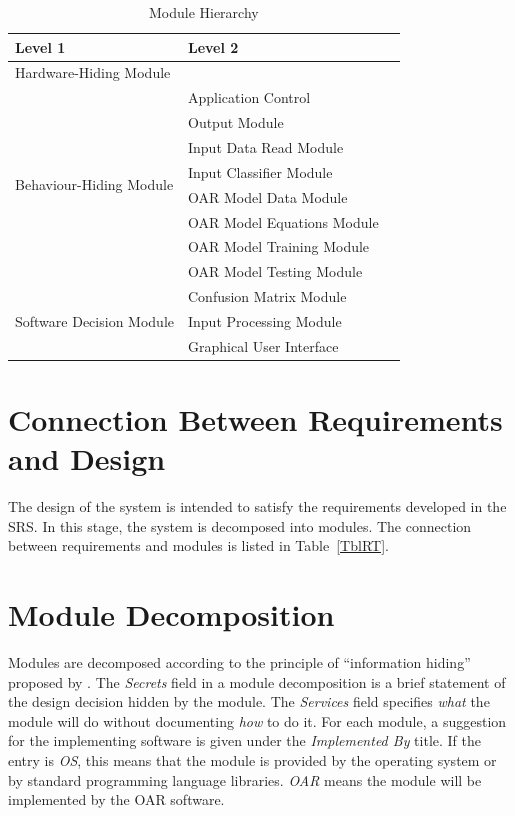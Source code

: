 \documentclass[12pt, titlepage]{article}
\begin{document}
\begin{table}[h!]
\centering
\begin{tabular}{p{} p{} p{}}
\toprule
\textbf{Level 1} & \textbf{Level 2}\\
\midrule
  
{Hardware-Hiding Module}\\
\midrule
  
\multirow{8}{0.3\textwidth}{Behaviour-Hiding Module}
  & Application Control \\
    \cline{2-3}
  & Output Module\\
  & Input Data Read Module \\
  & Input Classifier Module\\
    \cline{2-3}
  & OAR Model Data Module \\
  & OAR Model Equations Module \\
  & OAR Model Training Module \\
  & OAR Model Testing Module \\
  \midrule
  
  \multirow{3}{0.3\textwidth}{Software Decision Module}
    & Confusion Matrix Module \\
    \cline{2-3}
    & Input Processing Module \\
    \cline{2-3}
    & Graphical User Interface \\
  \bottomrule
  
  \end{tabular}
\caption{Module Hierarchy}
\label{TblMH}
\end{table}

\section{Connection Between Requirements and Design} \label{SecConnection}

The design of the system is intended to satisfy the requirements developed in
the SRS. In this stage, the system is decomposed into modules. The connection
between requirements and modules is listed in Table~\ref{TblRT}.

\section{Module Decomposition} \label{SecMD}

Modules are decomposed according to the principle of ``information hiding''
proposed by \citet{ParnasEtAl1984}. The \emph{Secrets} field in a module
decomposition is a brief statement of the design decision hidden by the
module. The \emph{Services} field specifies \emph{what} the module will do
without documenting \emph{how} to do it. For each module, a suggestion for the
implementing software is given under the \emph{Implemented By} title. If the
entry is \emph{OS}, this means that the module is provided by the operating
system or by standard programming language libraries.  \emph{OAR} means the
module will be implemented by the OAR software.
\end{document}
